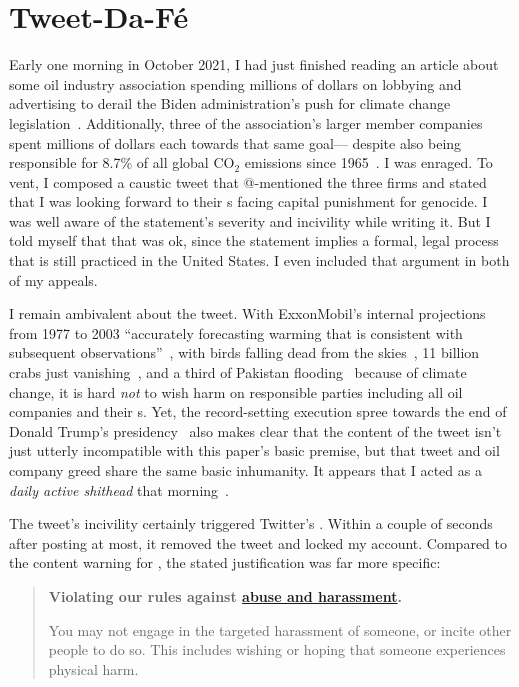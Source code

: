 \section{Tweet-Da-F\'e}
\label{sec:tweet-da-fe}

Early one morning in October 2021, I had just finished reading an article about
some oil industry association spending millions of dollars on lobbying and
advertising to derail the Biden administration's push for climate change
legislation~\cite{Tabuchi2021}. Additionally, three of the association's larger
member companies spent millions of dollars each towards that same goal---%
despite also being responsible for 8.7\% of all global CO$_2$ emissions since
1965~\cite{TaylorWatts2019}. I was enraged. To vent, I composed a caustic tweet
that @-mentioned the three firms and stated that I was looking forward to their
s facing capital punishment for genocide. I was well aware of the
statement's severity and incivility while writing it. But I told myself that
that was ok, since the statement implies a formal, legal process that is still
practiced in the United States. I even included that argument in both of my
appeals.

I remain ambivalent about the tweet. With ExxonMobil's internal projections from
1977 to 2003 ``accurately forecasting warming that is consistent with subsequent
observations''~\cite{SupranRahmstorf2023}, with birds falling dead from the
skies~\cite{Dave2022}, 11 billion crabs just vanishing~\cite{Olmstead2022}, and
a third of Pakistan flooding~\cite{Chughtai2022} because of climate change, it
is hard \emph{not} to wish harm on responsible parties including all oil
companies and their s. Yet, the record-setting execution spree towards
the end of Donald Trump's
presidency~\cite{Arnsdorf2020,Kovarsky2022,SuebsaengReis2023} also makes clear
that the content of the tweet isn't just utterly incompatible with this paper's
basic premise, but that tweet and oil company greed share the same basic
inhumanity. It appears that I acted as a \emph{daily active shithead} that
morning~\cite{Sherman2021}.

The tweet's incivility certainly triggered Twitter's . Within a couple of
seconds after posting at most, it removed the tweet and locked my account.
Compared to the content warning for \DALLE, the stated justification was far
more specific:

\begin{quote}
\openfat\textbf{Violating our rules against
\href{https://web.archive.org/web/20220905021323/https://help.twitter.com/en/rules-and-policies/abusive-behavior}{abuse
and harassment}.}

You may not engage in the targeted harassment of someone, or incite other people
to do so. This includes wishing or hoping that someone experiences physical
harm.\closefat{}
\end{quote}


